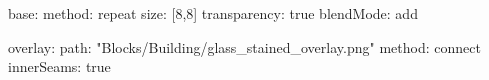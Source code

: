 base:
  method: repeat
  size: [8,8]
  transparency: true
  blendMode: add
  
overlay:
  path: "Blocks/Building/glass_stained_overlay.png"
  method: connect
  innerSeams: true